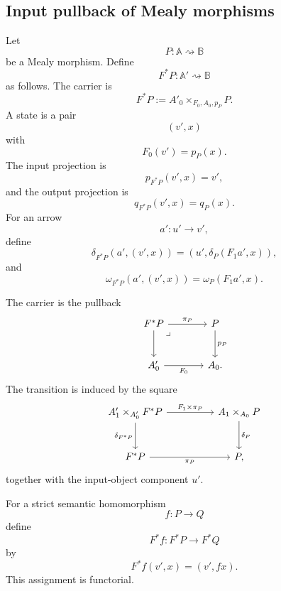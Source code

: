 \subsection{Input pullback of Mealy morphisms}
\label{subsec:input-pullback-mealy}

\begin{definition}
\label{def:input-pullback-mealy}
    Let
    \[
        P:\mathbb A\rightsquigarrow\mathbb B
    \]
    be a Mealy morphism. Define
    \[
        F^*P:\mathbb A'\rightsquigarrow\mathbb B
    \]
    as follows. The carrier is
    \[
        F^*P
        :=
        A'_0\times_{F_0,A_0,p_P}P.
    \]
    A state is a pair
    \[
        (v',x)
    \]
    with
    \[
        F_0(v')=p_P(x).
    \]
    The input projection is
    \[
        p_{F^*P}(v',x)=v',
    \]
    and the output projection is
    \[
        q_{F^*P}(v',x)=q_P(x).
    \]
    For an arrow
    \[
        a':u'\to v',
    \]
    define
    \[
        \delta_{F^*P}(a',(v',x))
        =
        (u',\delta_P(F_1a',x)),
    \]
    and
    \[
        \omega_{F^*P}(a',(v',x))
        =
        \omega_P(F_1a',x).
    \]
\end{definition}

The carrier is the pullback
\[
\begin{tikzcd}[column sep=large, row sep=large]
    F^*P
        \arrow[r, "\pi_P"]
        \arrow[d]
        \arrow[dr, phantom, "\lrcorner", very near start]
    &
    P
        \arrow[d, "p_P"]
    \\
    A'_0
        \arrow[r, "F_0"']
    &
    A_0 .
\end{tikzcd}
\]
The transition is induced by the square
\[
\begin{tikzcd}[column sep=huge, row sep=large]
    A'_1\times_{A'_0}F^*P
        \arrow[r, "{F_1\times \pi_P}"]
        \arrow[d, "\delta_{F^*P}"']
    &
    A_1\times_{A_0}P
        \arrow[d, "\delta_P"]
    \\
    F^*P
        \arrow[r, "\pi_P"']
    &
    P ,
\end{tikzcd}
\]
together with the input-object component \(u'\).

For a strict semantic homomorphism
\[
    f:P\to Q
\]
define
\[
    F^*f:F^*P\to F^*Q
\]
by
\[
    F^*f(v',x)=(v',fx).
\]
This assignment is functorial.

